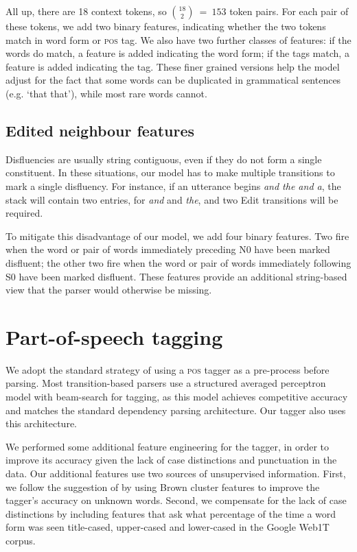 \documentclass[11pt,letterpaper]{article}
\newcommand{\pos}{\textsc{pos}\xspace}
\begin{document}
All up, there are 18 context tokens, so ${18 \choose 2}~=~153$ token pairs.
For each pair of these tokens, we add two binary features, indicating whether the
two tokens match in word form or \pos tag.  We also have two further classes of
features: if the words do match, a feature is added indicating the word form;
if the tags match, a feature is added indicating the tag. These finer grained
versions help the model adjust for the fact that some words can be duplicated
in grammatical sentences (e.g. `that that'), while most rare words cannot.

\subsection{Edited neighbour features}

Disfluencies are usually
string contiguous, even if they do not form a single constituent.
In these situations, our model has to make multiple transitions to mark a single
disfluency. For instance, if an utterance begins \emph{and the and a}, the stack
will contain two entries, for \emph{and} and \emph{the}, and two Edit transitions
will be required.

To mitigate this disadvantage of our model, we add four binary features. Two fire
when the word or pair of words immediately preceding N0 have been marked disfluent;
the other two fire when the word or pair of words immediately following S0
have been marked disfluent. These features provide an additional string-based
view that the parser would otherwise be missing.


\section{Part-of-speech tagging}

We adopt the standard strategy of using a \pos tagger as a pre-process
before parsing.  Most transition-based
parsers use a structured averaged perceptron model with beam-search for tagging,
as this model achieves competitive accuracy and matches the standard dependency
parsing architecture. Our tagger also uses this architecture.

We performed some additional feature engineering for the tagger, in order to
improve its accuracy given the lack of case distinctions and punctuation in
the data. Our additional features use two sources of unsupervised information.
First, we follow the suggestion of \citet{manning:11} by using Brown cluster
features to improve the tagger's accuracy on unknown words. Second, we compensate
for the lack of case distinctions by including features that ask what percentage
of the time a word form was seen title-cased, upper-cased and lower-cased in the
Google Web1T corpus. 
\end{document}
